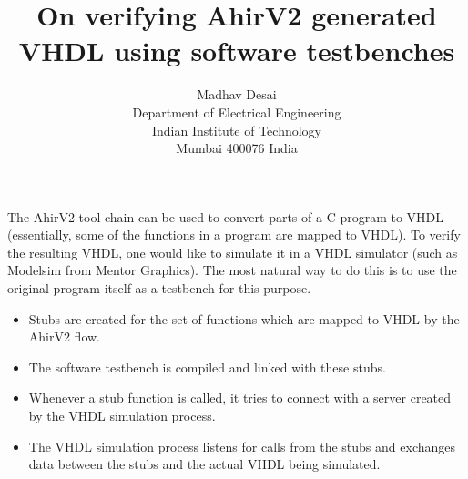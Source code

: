 \documentclass{article}
\title{On verifying AhirV2 generated VHDL using software testbenches}
\author{Madhav Desai \\ Department of Electrical Engineering \\ Indian Institute of Technology \\
	Mumbai 400076 India}
\begin{document}
\maketitle


The AhirV2 tool chain can be used to convert parts of a C program to VHDL
(essentially, some of the functions in a program are mapped to VHDL).
To verify the resulting VHDL, one would like to simulate it in a
VHDL simulator (such as Modelsim from Mentor Graphics).  The most
natural way to do this is to use the original program itself
as a testbench for this purpose.

\begin{itemize}
\item Stubs are created for the set of functions which are mapped to  
VHDL by the AhirV2 flow.
\item The software testbench is compiled and linked with these stubs.
\item Whenever a stub function is called, it tries to connect with
a server created by the VHDL simulation process.
\item The VHDL simulation process listens for calls from the stubs
and exchanges data between the stubs and the actual VHDL being simulated.
\end{itemize}
\end{document}
